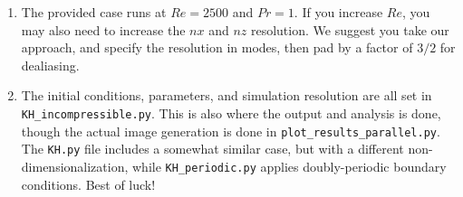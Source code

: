 \documentclass[12pt, preprint]{aastex}
\begin{document}
\begin{description}
\begin{enumerate}
         \item The provided case runs at $Re=2500$ and $Pr=1$.  If you
           increase $Re$, you may also need to increase the $nx$ and
           $nz$ resolution.  We suggest you take our approach, and
           specify the resolution in modes, then pad by a factor of
           $3/2$ for dealiasing.


         \item The initial conditions, parameters, and simulation
           resolution are all set in \verb+KH_incompressible.py+.  This is also where
           the output and analysis is done, though the actual image
           generation is done in \verb+plot_results_parallel.py+.  The
           \verb+KH.py+ file includes a somewhat similar case, but
           with a different non-dimensionalization, while
           \verb+KH_periodic.py+ applies doubly-periodic boundary conditions.
           Best of luck!

\end{enumerate}
\end{description}
\end{document}
